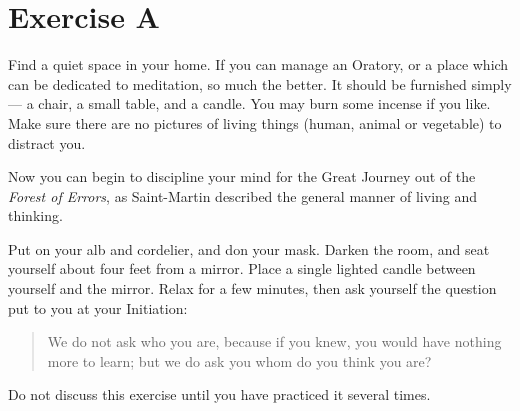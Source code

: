 \chapter{Exercise A}
Find a quiet space in your home. If you can manage an Oratory, or a place which can be
dedicated to meditation, so much the better. It should be furnished simply --– a chair, a small
table, and a candle. You may burn some incense if you like. Make sure there are no pictures of
living things (human, animal or vegetable) to distract you.

Now you can begin to discipline your mind for the Great Journey out of the \textit{Forest of Errors}, as
Saint-Martin described the general manner of living and thinking.

Put on your alb and cordelier, and don your mask. Darken the room, and seat yourself about four
feet from a mirror. Place a single lighted candle between yourself and the mirror. Relax for a
few minutes, then ask yourself the question put to you at your Initiation:

\begin{quote}
    We do not ask who you are, because if you knew, you would have nothing more to learn; but
we do ask you whom do you think you are?
\end{quote}

Do not discuss this exercise until you have practiced it several times.


